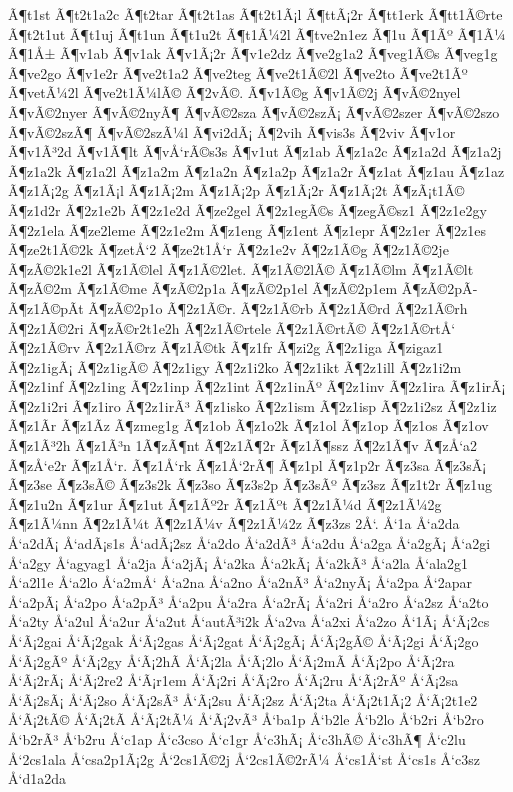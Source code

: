 {Ã¶t1st
Ã¶t2t1a2c
Ã¶t2tar
Ã¶t2t1as
Ã¶t2t1Ã¡l
Ã¶ttÃ¡2r
Ã¶tt1erk
Ã¶tt1Ã©rte
Ã¶t2t1ut
Ã¶t1uj
Ã¶t1un
Ã¶t1u2t
Ã¶t1Ã¼2l
Ã¶tve2n1ez
Ã¶1u
Ã¶1Ãº
Ã¶1Ã¼
Ã¶1Å±
Ã¶v1ab
Ã¶v1ak
Ã¶v1Ã¡2r
Ã¶v1e2dz
Ã¶ve2g1a2
Ã¶veg1Ã©s
Ã¶veg1g
Ã¶ve2go
Ã¶v1e2r
Ã¶ve2t1a2
Ã¶ve2teg
Ã¶ve2t1Ã©2l
Ã¶ve2to
Ã¶ve2t1Ãº
Ã¶vetÃ¼2l
Ã¶ve2t1Ã¼lÃ©
Ã¶2vÃ©.
Ã¶v1Ã©g
Ã¶v1Ã©2j
Ã¶vÃ©2nyel
Ã¶vÃ©2nyer
Ã¶vÃ©2nyÃ¶
Ã¶vÃ©2sza
Ã¶vÃ©2szÃ¡
Ã¶vÃ©2szer
Ã¶vÃ©2szo
Ã¶vÃ©2szÃ¶
Ã¶vÃ©2szÃ¼l
Ã¶vi2dÃ¡
Ã¶2vih
Ã¶vis3s
Ã¶2viv
Ã¶v1or
Ã¶v1Ã³2d
Ã¶v1Ã¶lt
Ã¶vÅ‘rÃ©s3s
Ã¶v1ut
Ã¶z1ab
Ã¶z1a2c
Ã¶z1a2d
Ã¶z1a2j
Ã¶z1a2k
Ã¶z1a2l
Ã¶z1a2m
Ã¶z1a2n
Ã¶z1a2p
Ã¶z1a2r
Ã¶z1at
Ã¶z1au
Ã¶z1az
Ã¶z1Ã¡2g
Ã¶z1Ã¡l
Ã¶z1Ã¡2m
Ã¶z1Ã¡2p
Ã¶z1Ã¡2r
Ã¶z1Ã¡2t
Ã¶zÃ¡t1Ã©
Ã¶z1d2r
Ã¶2z1e2b
Ã¶2z1e2d
Ã¶ze2gel
Ã¶2z1egÃ©s
Ã¶zegÃ©sz1
Ã¶2z1e2gy
Ã¶2z1ela
Ã¶ze2leme
Ã¶2z1e2m
Ã¶z1eng
Ã¶z1ent
Ã¶z1epr
Ã¶2z1er
Ã¶2z1es
Ã¶ze2t1Ã©2k
Ã¶zetÅ‘2
Ã¶ze2t1Å‘r
Ã¶2z1e2v
Ã¶2z1Ã©g
Ã¶2z1Ã©2je
Ã¶zÃ©2k1e2l
Ã¶z1Ã©lel
Ã¶z1Ã©2let.
Ã¶z1Ã©2lÃ©
Ã¶z1Ã©lm
Ã¶z1Ã©lt
Ã¶zÃ©2m
Ã¶z1Ã©me
Ã¶zÃ©2p1a
Ã¶zÃ©2p1el
Ã¶zÃ©2p1em
Ã¶zÃ©2pÃ­
Ã¶z1Ã©pÃ­t
Ã¶zÃ©2p1o
Ã¶2z1Ã©r.
Ã¶2z1Ã©rb
Ã¶2z1Ã©rd
Ã¶2z1Ã©rh
Ã¶2z1Ã©2ri
Ã¶zÃ©r2t1e2h
Ã¶2z1Ã©rtele
Ã¶2z1Ã©rtÃ©
Ã¶2z1Ã©rtÅ‘
Ã¶2z1Ã©rv
Ã¶2z1Ã©rz
Ã¶z1Ã©tk
Ã¶z1fr
Ã¶zi2g
Ã¶2z1iga
Ã¶zigaz1
Ã¶2z1igÃ¡
Ã¶2z1igÃ©
Ã¶2z1igy
Ã¶2z1i2ko
Ã¶2z1ikt
Ã¶2z1ill
Ã¶2z1i2m
Ã¶2z1inf
Ã¶2z1ing
Ã¶2z1inp
Ã¶2z1int
Ã¶2z1inÃº
Ã¶2z1inv
Ã¶2z1ira
Ã¶z1irÃ¡
Ã¶2z1i2ri
Ã¶z1iro
Ã¶2z1irÃ³
Ã¶z1isko
Ã¶2z1ism
Ã¶2z1isp
Ã¶2z1i2sz
Ã¶2z1iz
Ã¶z1Ã­r
Ã¶z1Ã­z
Ã¶zmeg1g
Ã¶z1ob
Ã¶z1o2k
Ã¶z1ol
Ã¶z1op
Ã¶z1os
Ã¶z1ov
Ã¶z1Ã³2h
Ã¶z1Ã³n
1Ã¶zÃ¶nt
Ã¶2z1Ã¶2r
Ã¶z1Ã¶ssz
Ã¶2z1Ã¶v
Ã¶zÅ‘a2
Ã¶zÅ‘e2r
Ã¶z1Å‘r.
Ã¶z1Å‘rk
Ã¶z1Å‘2rÃ¶
Ã¶z1pl
Ã¶z1p2r
Ã¶z3sa
Ã¶z3sÃ¡
Ã¶z3se
Ã¶z3sÃ©
Ã¶z3s2k
Ã¶z3so
Ã¶z3s2p
Ã¶z3sÃº
Ã¶z3sz
Ã¶z1t2r
Ã¶z1ug
Ã¶z1u2n
Ã¶z1ur
Ã¶z1ut
Ã¶z1Ãº2r
Ã¶z1Ãºt
Ã¶2z1Ã¼d
Ã¶2z1Ã¼2g
Ã¶z1Ã¼nn
Ã¶2z1Ã¼t
Ã¶2z1Ã¼v
Ã¶2z1Ã¼2z
Ã¶z3zs
2Å‘.
Å‘1a
Å‘a2da
Å‘a2dÃ¡
Å‘adÃ¡s1s
Å‘adÃ¡2sz
Å‘a2do
Å‘a2dÃ³
Å‘a2du
Å‘a2ga
Å‘a2gÃ¡
Å‘a2gi
Å‘a2gy
Å‘agyag1
Å‘a2ja
Å‘a2jÃ¡
Å‘a2ka
Å‘a2kÃ¡
Å‘a2kÃ³
Å‘a2la
Å‘ala2g1
Å‘a2l1e
Å‘a2lo
Å‘a2mÅ‘
Å‘a2na
Å‘a2no
Å‘a2nÃ³
Å‘a2nyÃ¡
Å‘a2pa
Å‘2apar
Å‘a2pÃ¡
Å‘a2po
Å‘a2pÃ³
Å‘a2pu
Å‘a2ra
Å‘a2rÃ¡
Å‘a2ri
Å‘a2ro
Å‘a2sz
Å‘a2to
Å‘a2ty
Å‘a2ul
Å‘a2ur
Å‘a2ut
Å‘autÃ³i2k
Å‘a2va
Å‘a2xi
Å‘a2zo
Å‘1Ã¡
Å‘Ã¡2cs
Å‘Ã¡2gai
Å‘Ã¡2gak
Å‘Ã¡2gas
Å‘Ã¡2gat
Å‘Ã¡2gÃ¡
Å‘Ã¡2gÃ©
Å‘Ã¡2gi
Å‘Ã¡2go
Å‘Ã¡2gÃº
Å‘Ã¡2gy
Å‘Ã¡2hÃ­
Å‘Ã¡2la
Å‘Ã¡2lo
Å‘Ã¡2mÃ­
Å‘Ã¡2po
Å‘Ã¡2ra
Å‘Ã¡2rÃ¡
Å‘Ã¡2re2
Å‘Ã¡r1em
Å‘Ã¡2ri
Å‘Ã¡2ro
Å‘Ã¡2ru
Å‘Ã¡2rÃº
Å‘Ã¡2sa
Å‘Ã¡2sÃ¡
Å‘Ã¡2so
Å‘Ã¡2sÃ³
Å‘Ã¡2su
Å‘Ã¡2sz
Å‘Ã¡2ta
Å‘Ã¡2t1Ã¡2
Å‘Ã¡2t1e2
Å‘Ã¡2tÃ©
Å‘Ã¡2tÃ­
Å‘Ã¡2tÃ¼
Å‘Ã¡2vÃ³
Å‘ba1p
Å‘b2le
Å‘b2lo
Å‘b2ri
Å‘b2ro
Å‘b2rÃ³
Å‘b2ru
Å‘c1ap
Å‘c3cso
Å‘c1gr
Å‘c3hÃ¡
Å‘c3hÃ©
Å‘c3hÃ¶
Å‘c2lu
Å‘2cs1ala
Å‘csa2p1Ã¡2g
Å‘2cs1Ã©2j
Å‘2cs1Ã©2rÃ¼
Å‘cs1Å‘st
Å‘cs1s
Å‘c3sz
Å‘d1a2da
}
